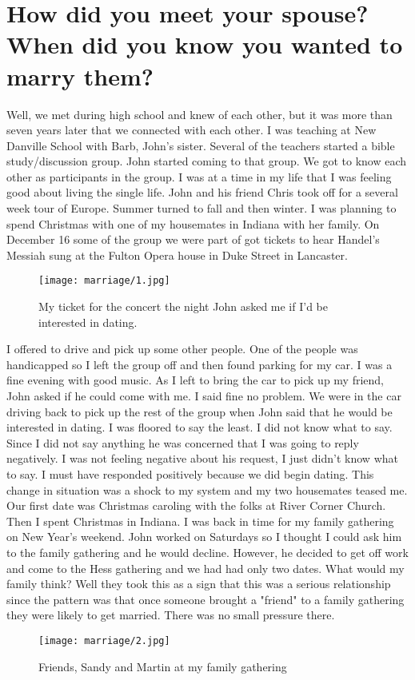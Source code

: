 \section{How did you meet your spouse? When did you know you wanted to marry them?}
Well, we met during high school and knew of each other, but it was more than seven years later that we connected with each other.
I was teaching at New Danville School with Barb, John's sister.
Several of the teachers started a bible study/discussion group.
John started coming to that group.
We got to know each other as participants in the group.
I was at a time in my life that I was feeling good about living the single life.
John and his friend Chris took off for a several week tour of Europe.
Summer turned to fall and then winter.
I was planning to spend Christmas with one of my housemates in Indiana with her family.
On December 16 some of the group we were part of got tickets to hear Handel's Messiah sung at the Fulton Opera house in Duke Street in Lancaster.
\begin{figure}
\centering
\texttt{[image: marriage/1.jpg]}
\caption{
My ticket for the concert the night John asked me if I'd be interested in dating.
}
\end{figure}

I offered to drive and pick up some other people.
One of the people was handicapped so I left the group off and then found parking for my car.
I was a fine evening with good music.
As I left to bring the car to pick up my friend, John asked if he could come with me.
I said fine no problem.
We were in the car driving back to pick up the rest of the group when John said that he would be interested in dating.
I was floored to say the least.
I did not know what to say.
Since I did not say anything he was concerned that I was going to reply negatively.
I was not feeling negative about his request, I just didn't know what to say.
I must have responded positively because we did begin dating.
This change in situation was a shock to my system and my two housemates teased me.
Our first date was Christmas caroling with the folks at River Corner Church.
Then I spent Christmas in Indiana.
I was back in time for my family gathering on New Year's weekend.
John worked on Saturdays so I thought I could ask him to the family gathering and he would decline.
However, he decided to get off work and come to the Hess gathering and we had had only two dates.
What would my family think?
Well they took this as a sign that this was a serious relationship since the pattern was that once someone brought a "friend" to a family gathering they were likely to get married.
There was no small pressure there.
\begin{figure}
\centering
\texttt{[image: marriage/2.jpg]}
\caption{
Friends, Sandy and Martin at my family gathering
}
\end{figure}

